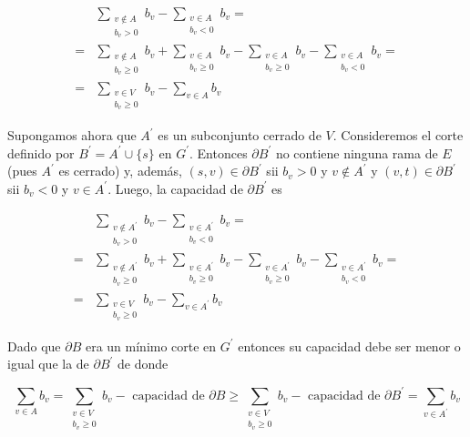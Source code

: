 \documentclass[10pt]{article}
\begin{document}
$$
\begin{aligned}
& \sum_{\substack{v \notin A \\
b_{v}>0}} b_{v}-\sum_{\substack{v \in A \\
b_{v}<0}} b_{v}= \\
= & \sum_{\substack{v \notin A \\
b_{v} \geq 0}} b_{v}+\sum_{\substack{v \in A \\
b_{v} \geq 0}} b_{v}-\sum_{\substack{v \in A \\
b_{v} \geq 0}} b_{v}-\sum_{\substack{v \in A \\
b_{v}<0}} b_{v}= \\
= & \sum_{\substack{v \in V \\
b_{v} \geq 0}} b_{v}-\sum_{v \in A} b_{v}
\end{aligned}
$$

Supongamos ahora que $A^{\prime}$ es un subconjunto cerrado de $V$. Consideremos el corte definido por $B^{\prime}=A^{\prime} \cup\{s\}$ en $G^{\prime}$. Entonces $\partial B^{\prime}$ no contiene ninguna rama de $E$ (pues $A^{\prime}$ es cerrado) y, además, $(s, v) \in \partial B^{\prime}$ sii $b_{v}>0$ y $v \notin A^{\prime}$ y $(v, t) \in \partial B^{\prime}$ sii $b_{v}<0$ y $v \in A^{\prime}$. Luego, la capacidad de $\partial B^{\prime}$ es

$$
\begin{aligned}
& \sum_{\substack{v \notin A^{\prime} \\
b_{v}>0}} b_{v}-\sum_{\substack{v \in A^{\prime} \\
b_{v}<0}} b_{v}= \\
= & \sum_{\substack{v \notin A^{\prime} \\
b_{v} \geq 0}} b_{v}+\sum_{\substack{v \in A^{\prime} \\
b_{v} \geq 0}} b_{v}-\sum_{\substack{v \in A^{\prime} \\
b_{v} \geq 0}} b_{v}-\sum_{\substack{v \in A^{\prime} \\
b_{v}<0}} b_{v}= \\
= & \sum_{\substack{v \in V \\
b_{v} \geq 0}} b_{v}-\sum_{v \in A^{\prime}} b_{v}
\end{aligned}
$$

Dado que $\partial B$ era un mínimo corte en $G^{\prime}$ entonces su capacidad debe ser menor o igual que la de $\partial B^{\prime}$ de donde

$$
\sum_{v \in A} b_{v}=\sum_{\substack{v \in V \\ b_{v} \geq 0}} b_{v}-\text { capacidad de } \partial B \geq \sum_{\substack{v \in V \\ b_{v} \geq 0}} b_{v}-\text { capacidad de } \partial B^{\prime}=\sum_{v \in A^{\prime}} b_{v}
$$
\end{document}
